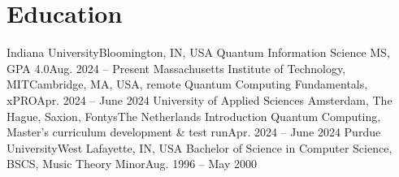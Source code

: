\section{Education}
  \resumeSubHeadingListStart
  \resumeSubheading
      {Indiana University}{Bloomington, IN, USA}
      {Quantum Information Science MS, GPA 4.0}{Aug. 2024 -- Present}
      \resumeItemListStart
      \resumeItemListEnd
    \resumeSubheading
      {Massachusetts Institute of Technology, MIT}{Cambridge, MA, USA, remote}
      {Quantum Computing Fundamentals, xPRO}{Apr. 2024 -- June 2024}
    \resumeSubheading
      {University of Applied Sciences Amsterdam, The Hague, Saxion, Fontys}{The Netherlands}
      {Introduction Quantum Computing, Master's curriculum development \& test run}{Apr. 2024 -- June 2024}
    \resumeSubheading
      {Purdue University}{West Lafayette, IN, USA}
      {Bachelor of Science in Computer Science, BSCS, Music Theory Minor}{Aug. 1996 -- May 2000}
  \resumeSubHeadingListEnd
